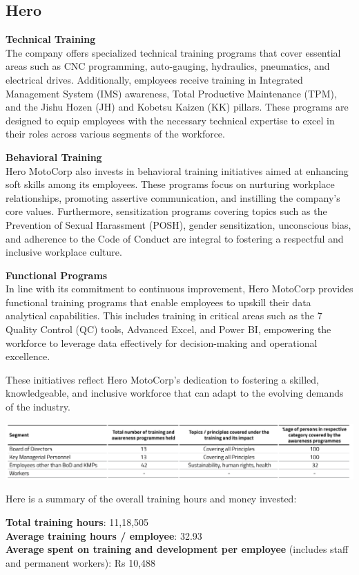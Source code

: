 \subsection{Hero}

\textbf{Technical Training}\\
The company offers specialized technical training programs that cover essential areas such as CNC programming, auto-gauging, hydraulics, pneumatics, and electrical drives. Additionally, employees receive training in Integrated Management System (IMS) awareness, Total Productive Maintenance (TPM), and the Jishu Hozen (JH) and Kobetsu Kaizen (KK) pillars. These programs are designed to equip employees with the necessary technical expertise to excel in their roles across various segments of the workforce.

\textbf{Behavioral Training}\\
Hero MotoCorp also invests in behavioral training initiatives aimed at enhancing soft skills among its employees. These programs focus on nurturing workplace relationships, promoting assertive communication, and instilling the company's core values. Furthermore, sensitization programs covering topics such as the Prevention of Sexual Harassment (POSH), gender sensitization, unconscious bias, and adherence to the Code of Conduct are integral to fostering a respectful and inclusive workplace culture.

\textbf{Functional Programs}\\
In line with its commitment to continuous improvement, Hero MotoCorp provides functional training programs that enable employees to upskill their data analytical capabilities. This includes training in critical areas such as the 7 Quality Control (QC) tools, Advanced Excel, and Power BI, empowering the workforce to leverage data effectively for decision-making and operational excellence.

These initiatives reflect Hero MotoCorp's dedication to fostering a skilled, knowledgeable, and inclusive workforce that can adapt to the evolving demands of the industry.

\includegraphics[width=\linewidth]{psycho_images/Hero_Training.png}

Here is a summary of the overall training hours and money invested:

\textbf{Total training hours}: 11,18,505 \\
\textbf{Average training hours / employee}: 32.93 \\
\textbf{Average spent on training and development per employee} (includes staff and permanent workers): Rs 10,488 \\

